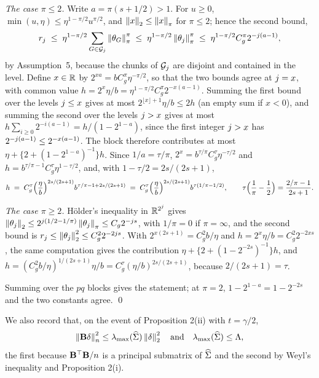 \emph{The case $\pi \le 2$.} Write $a = \pi(s+1/2) > 1$. For $u \ge 0$,
$\min(u,\eta) \le \eta^{1-\pi/2}u^{\pi/2}$, and $\left\lVert x \right\rVert_{2} \le \left\lVert x \right\rVert_{\pi}$
for $\pi \le 2$; hence the second bound,
\[
  r_{j} \;\le\; \eta^{1-\pi/2}\sum_{G\in\mathcal{G}_{j}}\left\lVert \theta_{G} \right\rVert_{\pi}^{\pi}
  \;\le\; \eta^{1-\pi/2}\left\lVert \theta_{j} \right\rVert_{\pi}^{\pi}
  \;\le\; \eta^{1-\pi/2}C_g^{\pi}2^{-j(a-1)},
\]
by Assumption~5, because the chunks of $\mathcal{G}_{j}$ are disjoint and
contained in the level. Define $x \in \mathbb{R}$ by
$2^{xa} = bC_g^{\pi}\eta^{-\pi/2}$, so that the two bounds agree at
$j = x$, with common value
$h = 2^{x}\eta/b = \eta^{1-\pi/2}C_g^{\pi}2^{-x(a-1)}$. Summing the first bound
over the levels $j \le x$ gives at most $2^{\lfloor x\rfloor+1}\eta/b \le 2h$
(an empty sum if $x < 0$), and summing the second over the levels $j > x$
gives at most $h\sum_{i\ge0}2^{-i(a-1)} = h/(1-2^{1-a})$, since the first
integer $j > x$ has $2^{-j(a-1)} \le 2^{-x(a-1)}$. The block therefore
contributes at most $\eta + \{2 + (1-2^{1-a})^{-1}\}h$. Since $1/a = \tau/\pi$,
$2^{x} = b^{\tau/\pi}C_g^{\tau}\eta^{-\tau/2}$ and
$h = b^{\tau/\pi-1}C_g^{\tau}\eta^{1-\tau/2}$, and, with
$1-\tau/2 = 2s/(2s+1)$,
\[
  h \;=\; C_g^{\tau}\Bigl(\frac{\eta}{b}\Bigr)^{2s/(2s+1)}
  b^{\tau/\pi - 1 + 2s/(2s+1)}
  \;=\; C_g^{\tau}\Bigl(\frac{\eta}{b}\Bigr)^{2s/(2s+1)}
  b^{\tau(1/\pi-1/2)},
  \qquad
  \tau\Bigl(\frac{1}{\pi}-\frac12\Bigr) = \frac{2/\pi-1}{2s+1}.
\]

\emph{The case $\pi \ge 2$.} Hölder's inequality in $\mathbb{R}^{2^{j}}$ gives
$\left\lVert \theta_{j} \right\rVert_{2} \le 2^{j(1/2-1/\pi)}\left\lVert \theta_{j} \right\rVert_{\pi} \le
C_g2^{-j s}$, with $1/\pi = 0$ if $\pi = \infty$, and the second bound is
$r_{j} \le \left\lVert \theta_{j} \right\rVert_{2}^{2} \le C_g^{2}2^{-2j s}$. With
$2^{x(2s+1)} = C_g^{2}b/\eta$ and $h = 2^{x}\eta/b = C_g^{2}2^{-2xs}$, the same
computation gives the contribution $\eta + \{2 + (1-2^{-2s})^{-1}\}h$, and
$h = (C_g^{2}b/\eta)^{1/(2s+1)}\eta/b = C_g^{\tau}(\eta/b)^{2s/(2s+1)}$, because
$2/(2s+1) = \tau$.

Summing over the $pq$ blocks gives the statement; at $\pi = 2$,
$1-2^{1-a} = 1-2^{-2s}$ and the two constants agree. \qed


We also record that, on the event of Proposition 2(ii) with $t = \gamma/2$,
\begin{equation}
  \label{eq:lmax}
  \left\lVert \mathbf{B}\delta \right\rVert_{n}^2 \le \lambda_{\max}(\widehat{\Sigma})\left\lVert \delta \right\rVert_2^2
  \quad\text{and}\quad \lambda_{\max}(\widehat{\Sigma}) \le \Lambda,
\end{equation}
the first because $\mathbf{B}^{\top}\mathbf{B}/n$ is a principal submatrix of $\widehat{\Sigma}$ and
the second by Weyl's inequality and Proposition 2(i).


